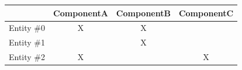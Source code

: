 \documentclass[oneside, 12pt, a4paper, openany]{book}
\begin{document}
\begin{longtable}[]{@{}lccc@{}}
\toprule
\begin{minipage}[b]{0.24\columnwidth}\raggedright\strut
\strut
\end{minipage} & \begin{minipage}[b]{0.24\columnwidth}\centering\strut
ComponentA\strut
\end{minipage} & \begin{minipage}[b]{0.24\columnwidth}\centering\strut
ComponentB\strut
\end{minipage} & \begin{minipage}[b]{0.24\columnwidth}\centering\strut
ComponentC\strut
\end{minipage}\tabularnewline
\midrule
\endhead
\begin{minipage}[t]{0.24\columnwidth}\raggedright\strut
Entity \#0\strut
\end{minipage} & \begin{minipage}[t]{0.24\columnwidth}\centering\strut
X\strut
\end{minipage} & \begin{minipage}[t]{0.24\columnwidth}\centering\strut
X\strut
\end{minipage} & \begin{minipage}[t]{0.24\columnwidth}\centering\strut
\strut
\end{minipage}\tabularnewline
\begin{minipage}[t]{0.24\columnwidth}\raggedright\strut
Entity \#1\strut
\end{minipage} & \begin{minipage}[t]{0.24\columnwidth}\centering\strut
\strut
\end{minipage} & \begin{minipage}[t]{0.24\columnwidth}\centering\strut
X\strut
\end{minipage} & \begin{minipage}[t]{0.24\columnwidth}\centering\strut
\strut
\end{minipage}\tabularnewline
\begin{minipage}[t]{0.24\columnwidth}\raggedright\strut
Entity \#2\strut
\end{minipage} & \begin{minipage}[t]{0.24\columnwidth}\centering\strut
X\strut
\end{minipage} & \begin{minipage}[t]{0.24\columnwidth}\centering\strut
\strut
\end{minipage} & \begin{minipage}[t]{0.24\columnwidth}\centering\strut
X\strut
\end{minipage}\tabularnewline
\bottomrule
\end{longtable}
\end{document}
